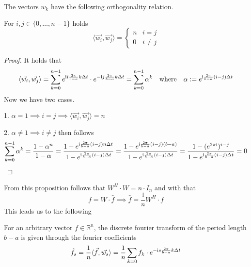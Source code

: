The vectors \(w_k\) have the following orthogonality relation.
\begin{proposition}
   For \(i,j \in \{0, \ldots, n-1\}\) holds
    \[\langle \vec{w_i}, \vec{w_j} \rangle = \begin{cases}n & i = j\\ 0 & i \neq j\end{cases}\]
\end{proposition}
\begin{proof}
   It holds that
   \[\langle \vec{w_i}, \vec{w_j} \rangle = \sum_{k=0}^{n-1} e^{\mathrm{i} i \frac{2\pi}{b-a} k \Delta t} \cdot e^{-\mathrm{i} j \frac{2\pi}{b-a} k \Delta t} = \sum_{k=0}^{n-1} \alpha^k \quad\text{where}\quad \alpha := e^{\mathrm{i} \frac{2\pi}{b-a} (i-j) \Delta t}\]
   Now we have two cases.

   1. \(\alpha = 1 \implies i = j \implies \langle \vec{w_i}, \vec{w_j} \rangle = n\)

   2. \(\alpha \neq 1 \implies i \neq j\) then follows
   \[\sum_{k=0}^{n-1} \alpha^k = \frac{1-\alpha^n}{1 - \alpha} = \frac{1 - e^{\mathrm{i} \frac{2\pi}{b-a} (i-j) n \Delta t}}{1 - e^{\mathrm{i} \frac{2\pi}{b-a} (i-j) \Delta t}} = \frac{1 - e^{\mathrm{i} \frac{2\pi}{b-a} (i-j) (b-a)}}{1 - e^{\mathrm{i} \frac{2\pi}{b-a} (i-j) \Delta t}} = \frac{1 - (e^{2\pi\mathrm{i}})^{i-j}}{1 - e^{\mathrm{i} \frac{2\pi}{b-a} (i-j) \Delta t}} = 0\]
\end{proof}

From this proposition follows that \(W^H \cdot W = n \cdot I_n\) and with that
\[f = W \cdot \hat{f} \implies \hat{f} = \frac{1}{n} W^H \cdot f\]
This leads us to the following
\begin{definition}
  For an arbitrary vector \(f \in \mathbb{R}^n\), the discrete fourier transform of the period length \(b-a\) is given through the fourier coefficients
  \[\hat{f}_s = \frac{1}{n} \langle \vec{f}, \vec{w_s}\rangle = \frac{1}{n} \sum_{k=0} f_k \cdot e^{- \mathrm{i} s \frac{2\pi}{b-a} k \Delta t}\]
\end{definition}

